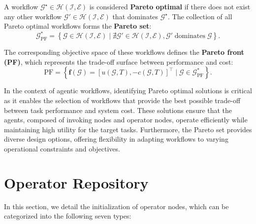 \documentclass{article}
\theoremstyle{plain}
\theoremstyle{definition}
\theoremstyle{remark}
\begin{document}
A workflow \(\mathcal{G}^\star \in \mathcal{H}(\mathcal{I}, \mathcal{E})\) is considered \textbf{Pareto optimal} if there does not exist any other workflow \(\mathcal{G}' \in \mathcal{H}(\mathcal{I}, \mathcal{E})\) that dominates \(\mathcal{G}^\star\). The collection of all Pareto optimal workflows forms the \textbf{Pareto set}:  
\begin{equation}
\mathcal{G}^*_{\text{PF}} = \left\{\mathcal{G} \in \mathcal{H}(\mathcal{I}, \mathcal{E}) \mid \nexists \mathcal{G}' \in \mathcal{H}(\mathcal{I}, \mathcal{E}), \mathcal{G}' \; \text{dominates} \; \mathcal{G} \right\}.
\end{equation}  

The corresponding objective space of these workflows defines the \textbf{Pareto front (PF)}, which represents the trade-off surface between performance and cost:  
\begin{equation}
\text{PF} = \left\{ \mathbf{f}(\mathcal{G}) = [u(\mathcal{G}, T), -c(\mathcal{G}, T)]^\top \mid \mathcal{G} \in \mathcal{G}^*_{\text{PF}} \right\}.
\end{equation}  

In the context of agentic workflows, identifying Pareto optimal solutions is critical as it enables the selection of workflows that provide the best possible trade-off between task performance and system cost. These solutions ensure that the agents, composed of invoking nodes and operator nodes, operate efficiently while maintaining high utility for the target tasks. Furthermore, the Pareto set provides diverse design options, offering flexibility in adapting workflows to varying operational constraints and objectives.

\section{Operator Repository}\label{app:operator}

In this section, we detail the initialization of operator nodes, which can be categorized into the following seven types:
\end{document}

